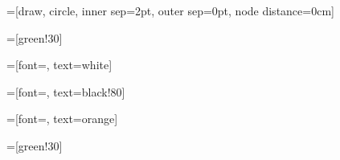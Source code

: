 	=[draw, circle, inner sep=2pt, outer sep=0pt, node distance=0cm]	
	
	=[green!30]	
	
	\makeatletter
		\def\trimspace#1{\trim@spaces@in{#1}}
	\makeatother

	\newcommand{\drawBinaryImage}[3]{%
	   
	    \pgfmathtruncatemacro{\gridwidth}{#1}
	    \pgfmathtruncatemacro{\gridheight}{#2}
	    \dataheight=\gridwidth
	    
	    \draw[gray,densely dashed] (0,0) grid (\gridwidth,\gridheight);
	    
	    \foreach \x in {1,...,\gridwidth}{%
	    	\foreach \y in {1,...,\gridheight}{%
	    	   
	            \pgfmathtruncatemacro{\colnum}{\x}
	            \pgfmathtruncatemacro{\rownum}{\gridheight+1-\y}
	            \expandafter\csname check#3\endcsname(\rownum,\colnum)\trimspace\cachedata
	            
	            \ifthenelse{\cachedata=0}
	            	{\fill[black,fill opacity=1] (\x-0.9,\y-0.9) rectangle (\x-0.1,\y-0.1);}
	            	{}
	            	
				\ifthenelse{\cachedata=1}
	            	{\fill[white,fill opacity=1] (\x-0.9,\y-0.9) rectangle (\x-0.1,\y-0.1);}
	            	{}
	            	
				\ifthenelse{\cachedata=2}
	            	{\fill[red,fill opacity=1] (\x-0.9,\y-0.9) rectangle (\x-0.1,\y-0.1);}
	            	{}	       
	            	
	            	
				\ifthenelse{\cachedata=3}
	            	{\fill[pixelBother,fill opacity=1] (\x-0.9,\y-0.9) rectangle (\x-0.1,\y-0.1);}
	            	{}	
	            
	     	}
	    }
	    
	}
	
	
	=[font=\fontsize{4pt}{2pt}\selectfont, text=white]

	=[font=\fontsize{4pt}{2pt}\selectfont, text=black!80]
	
	=[font=\fontsize{4pt}{2pt}\selectfont, text=orange]
	
	=[green!30]
	
